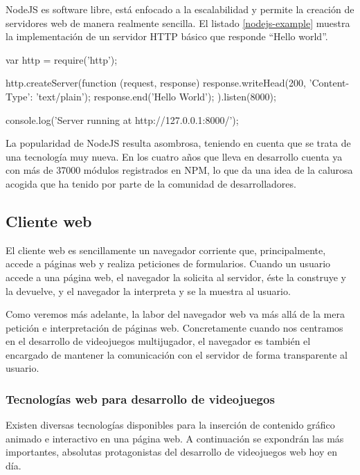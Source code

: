 NodeJS es software libre, está enfocado a la escalabilidad y permite la creación de servidores web de manera realmente sencilla. El listado \ref{nodejs-example} muestra la implementación de un servidor \acs{HTTP} básico que responde ``Hello world''.

\begin{listing}[language=javascript, caption={Servidor web básico implementado con NodeJS}, label=nodejs-example]
var http = require('http');
 
http.createServer(function (request, response) {
    response.writeHead(200, {'Content-Type': 'text/plain'});
    response.end('Hello World\n');
}).listen(8000);
 
console.log('Server running at http://127.0.0.1:8000/');
\end{listing}

La popularidad de NodeJS resulta asombrosa, teniendo en cuenta que se trata de una tecnología muy nueva. En los cuatro años que lleva en desarrollo cuenta ya con más de 37000 módulos registrados en \acs{NPM}, lo que da una idea de la calurosa acogida que ha tenido por parte de la comunidad de desarrolladores.

\subsection{Cliente web}
\label{sec::desarrollo-juegos}

El cliente web es sencillamente un navegador corriente que, principalmente, accede a páginas web y realiza peticiones de formularios. Cuando un usuario accede a una página web, el navegador la solicita al servidor, éste la construye y la devuelve, y el navegador la interpreta y se la muestra al usuario.

Como veremos más adelante, la labor del navegador web va más allá de la mera petición e interpretación de páginas web. Concretamente cuando nos centramos en el desarrollo de videojuegos multijugador, el navegador es también el encargado de mantener la comunicación con el servidor de forma transparente al usuario.

\subsubsection{Tecnologías web para desarrollo de videojuegos}

Existen diversas tecnologías disponibles para la inserción de contenido gráfico animado e interactivo en una página web. A continuación se expondrán las más importantes, absolutas protagonistas del desarrollo de videojuegos web hoy en día.

